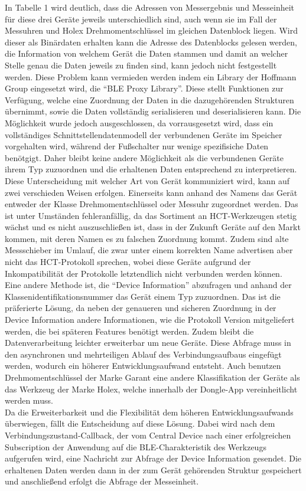 In Tabelle 1 wird deutlich, dass die Adressen von Messergebnis und Messeinheit für diese drei Geräte jeweils unterschiedlich sind, auch wenn sie im Fall der Messuhren und Holex Drehmomentschlüssel im gleichen Datenblock liegen. Wird dieser als Binärdaten erhalten kann die Adresse des Datenblocks gelesen werden, die Information von welchem Gerät die Daten stammen und damit an welcher Stelle genau die Daten jeweils zu finden sind, kann jedoch nicht festgestellt werden. Diese Problem kann vermieden werden indem ein Library der Hoffmann Group eingesetzt wird, die ``BLE Proxy Library''. Diese stellt Funktionen zur Verfügung, welche eine Zuordnung der Daten in die dazugehörenden Strukturen übernimmt, sowie die Daten vollständig serialisieren und deserialisieren kann. Die Möglichkeit wurde jedoch ausgeschlossen, da vorrausgesetzt wird, dass ein vollständiges Schnittstellendatenmodell der verbundenen Geräte im Speicher vorgehalten wird, während der Fußschalter nur wenige spezifisiche Daten benötgigt. Daher bleibt keine andere Möglichkeit als die verbundenen Geräte ihrem Typ zuzuordnen und die erhaltenen Daten entsprechend zu interpretieren.\\
Diese Unterscheidung mit welcher Art von Gerät kommuniziert wird, kann auf zwei verschieden Weisen erfolgen. Einerseits kann anhand des Namens das Gerät entweder der Klasse Drehmomentschlüssel oder Messuhr zugeordnet werden. Das ist unter Umständen fehleranfällig, da das Sortiment an \ac{HCT}-Werkzeugen stetig wächst und es nicht auszuschließen ist, dass in der Zukunft Geräte auf den Markt kommen, mit deren Namen es zu falschen Zuordnung kommt. Zudem sind alte Messschieber im Umlauf, die zwar unter einem korrekten Name advertisen aber nicht das \ac{HCT}-Protokoll sprechen, wobei diese Geräte aufgrund der Inkompatibilität der Protokolle letztendlich nicht verbunden werden können.\\
Eine andere Methode ist, die ``Device Information'' abzufragen und anhand der Klassenidentifikationsnummer das Gerät einem Typ zuzuordnen. Das ist die präferierte Lösung, da neben der genaueren und sicheren Zuordnung in der Device Information andere Informationen, wie die Protokoll Version mitgeliefert werden, die bei späteren Features benötigt werden. Zudem bleibt die Datenverarbeitung leichter erweiterbar um neue Geräte. Diese Abfrage muss in den asynchronen und mehrteiligen Ablauf des Verbindungsaufbaus eingefügt werden, wodurch ein höherer Entwicklungsaufwand entsteht. Auch benutzen Drehmomentschlüssel der Marke Garant eine andere Klassifikation der Geräte als das Werkzeug der Marke Holex, welche innerhalb der Dongle-App vereinheitlicht werden muss.\\
Da die Erweiterbarkeit und die Flexibilität dem höheren Entwicklungsaufwands überwiegen, fällt die Entscheidung auf diese Lösung. Dabei wird nach dem Verbindungszustand-Callback, der vom Central Device nach einer erfolgreichen Subscription der Anwendung auf die \ac{BLE}-Charakteristik des Werkzeugs aufgerufen wird, eine Nachricht zur Abfrage der Device Information gesendet. Die erhaltenen Daten werden dann in der zum Gerät gehörenden Struktur gespeichert und anschließend erfolgt die Abfrage der Messeinheit. 

